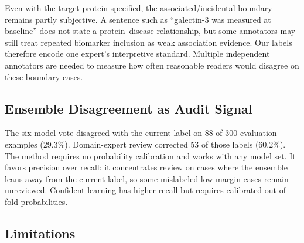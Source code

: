 \documentclass[sn-basic,pdflatex]{sn-jnl}
\begin{document}
Even with the target protein specified, the associated/incidental boundary remains partly subjective. A sentence such as ``galectin-3 was measured at baseline'' does not state a protein--disease relationship, but some annotators may still treat repeated biomarker inclusion as weak association evidence. Our labels therefore encode one expert's interpretive standard. Multiple independent annotators are needed to measure how often reasonable readers would disagree on these boundary cases.

\subsection{Ensemble Disagreement as Audit Signal}

The six-model vote disagreed with the current label on 88 of 300 evaluation examples (29.3\%). Domain-expert review corrected 53 of those labels (60.2\%).
The method requires no probability calibration and works with any model set. It favors precision over recall: it concentrates review on cases where the ensemble leans away from the current label, so some mislabeled low-margin cases remain unreviewed. Confident learning \citep{northcutt2021confident} has higher recall but requires calibrated out-of-fold probabilities.

\subsection{Limitations}
\end{document}
